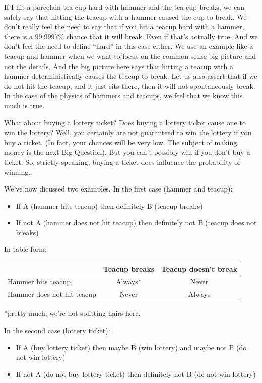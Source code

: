 \documentclass[openany]{book}
\providecommand{\tightlist}{%
  \setlength{\itemsep}{0pt}\setlength{\parskip}{0pt}}
\begin{document}
If I hit a porcelain tea cup hard with hammer and the tea cup breaks, we can safely say that hitting the teacup with a hammer caused the cup to break. We don't really feel the need to say that if you hit a teacup hard with a hammer, there is a 99.9997\% chance that it will break. Even if that's actually true. And we don't feel the need to define ``hard'' in this case either. We use an example like a teacup and hammer when we want to focus on the common-sense big picture and not the details. And the big picture here says that hitting a teacup with a hammer deterministically causes the teacup to break. Let us also assert that if we do not hit the teacup, and it just sits there, then it will not spontaneously break. In the case of the physics of hammers and teacups, we feel that we know this much is true.

What about buying a lottery ticket? Does buying a lottery ticket cause one to win the lottery? Well, you certainly are not guaranteed to win the lottery if you buy a ticket. (In fact, your chances will be very low. The subject of making money is the next Big Question). But you can't possibly win if you don't buy a ticket. So, strictly speaking, buying a ticket does influence the probability of winning.

We've now dicussed two examples. In the first case (hammer and teacup):

\begin{itemize}
\tightlist
\item
  If A (hammer hits teacup) then definitely B (teacup breaks)
\item
  If not A (hammer does not hit teacup) then definitely not B (teacup does not breaks)
\end{itemize}

In table form:

\begin{longtable}[]{@{}lcc@{}}
\toprule
& Teacup breaks & Teacup doesn't break\tabularnewline
\midrule
\endhead
Hammer hits teacup & Always* & Never\tabularnewline
Hammer does not hit teacup & Never & Always\tabularnewline
\bottomrule
\end{longtable}

*pretty much; we're not splitting hairs here.

In the second case (lottery ticket):

\begin{itemize}
\tightlist
\item
  If A (buy lottery ticket) then maybe B (win lottery) and maybe not B (do not win lottery)
\item
  If not A (do not buy lottery ticket) then definitely not B (do not win lottery)
\end{itemize}
\end{document}
